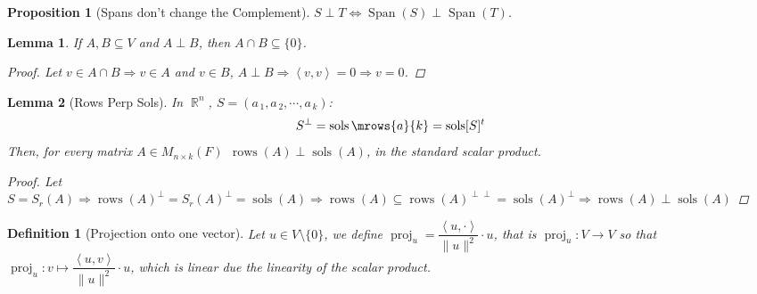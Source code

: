 \documentclass[12pt]{article}
\let\RA\Rightarrow
\let\LR\Leftrightarrow
\newcommand{\seq}[2]{\left({#1}_{\,1},{#1}_{\,2},\cdots,{#1}_{\,#2}\right)}
\newcommand{\inner}[2]{\left\langle{#1},{#2}\right\rangle}
\DeclareMathOperator{\R}{\mathbb{R}}
\DeclareMathOperator{\Span}{Span}
\DeclareMathOperator{\sols}{sols}
\DeclareMathOperator{\rows}{rows}
\DeclareMathOperator{\proj}{proj}
\newtheorem{definition}{Definition}[subsection]
\newtheorem{lemma}{Lemma}[subsection]
\newtheorem{proposition}{Proposition}[subsection]
\begin{document}
\begin{proposition}[Spans don't change the Complement]
  $S\perp T\LR \Span(S)\perp \Span(T)$.
\end{proposition}

\begin{lemma}
  If $A,B\subseteq V$ and $A\perp B$, then $A\cap B\subseteq\{0\}$. 
  \begin{proof}
    Let $v\in A\cap B\RA v\in A$ and $v\in B$, $A\perp B\RA\inner{v}{v}=0\RA v=0$.
  \end{proof}
\end{lemma}

\begin{lemma}[Rows Perp Sols]
  In $\R^n$, $S=\seq{a}{k}$:
  $$
  S^\perp=\sols\mrows{a}{k}=\sols[S]^t
  $$
  Then, for every matrix $A\in M_{n\times k}(F)\,\;\rows(A)\perp\sols(A)$, in the standard scalar product.
  \begin{proof}
    Let $S=S_r(A)\RA \rows(A)^\perp=S_r(A)^\perp=\sols(A)\RA \rows(A)\subseteq \rows(A)^{\perp\perp}=\sols(A)^\perp\RA \rows(A)\perp\sols(A)$
  \end{proof}
\end{lemma}

\begin{definition}[Projection onto one vector]
  Let $u\in V\setminus\{0\}$, we define $\proj_u=\dfrac{\inner{u}{\cdot}}{\|u\|^2}\cdot u$, that is $\proj_u:V\to V$ so that $\proj_u:v\mapsto \dfrac{\inner{u}{v}}{\|u\|^2}\cdot u$, which is linear due the linearity of the scalar product.
\end{definition}
\end{document}
